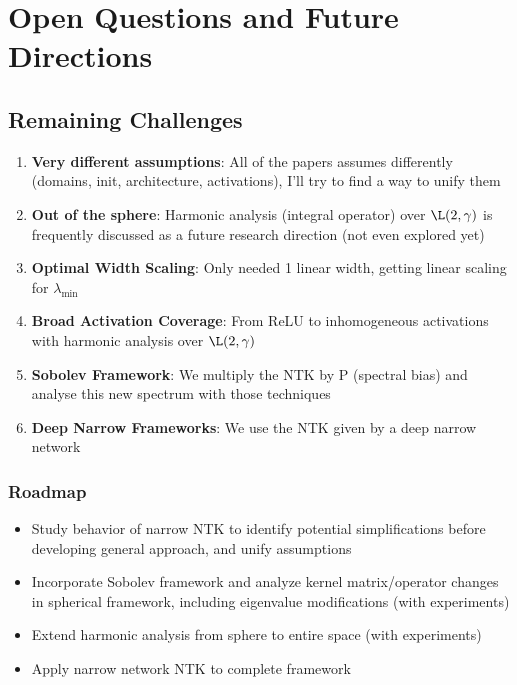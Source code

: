 \documentclass{article}
\newcommand{\lambdaMin}{\lambda_{\min}}
\begin{document}
\newpage



\section{Open Questions and Future Directions}

\subsection{Remaining Challenges}
\begin{enumerate}
    \item \textbf{Very different assumptions}: All of the papers assumes differently (domains, init, architecture, activations), I'll try to find a way to unify them
    \item \textbf{Out of the sphere}: Harmonic analysis (integral operator) over $\L(2,\gamma)$ is frequently discussed as a future research direction (not even explored yet)
    \item \textbf{Optimal Width Scaling}: Only needed 1 linear width, getting linear scaling for $\lambdaMin$
    \item \textbf{Broad Activation Coverage}: From ReLU to inhomogeneous activations with harmonic analysis over $\L(2,\gamma)$
    \item \textbf{Sobolev Framework}: We multiply the NTK by P (spectral bias) and analyse this new spectrum with those techniques
    \item \textbf{Deep Narrow Frameworks}: We use the NTK given by a deep narrow network
\end{enumerate}

\subsubsection{Roadmap}
\begin{itemize}
    \item Study behavior of narrow NTK to identify potential simplifications before developing general approach, and unify assumptions
    \item Incorporate Sobolev framework and analyze kernel matrix/operator changes in spherical framework, including eigenvalue modifications (with experiments)
    \item Extend harmonic analysis from sphere to entire space (with experiments)
    \item Apply narrow network NTK to complete framework
\end{itemize}
\end{document}
